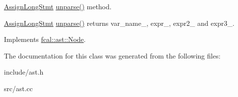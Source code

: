 \hyperlink{classfcal_1_1ast_1_1AssignLongStmt}{Assign\+Long\+Stmt} \hyperlink{classfcal_1_1ast_1_1AssignLongStmt_a7ff252236eef89c19c8c13c224cf8b81}{unparse()} method. 

\hyperlink{classfcal_1_1ast_1_1AssignLongStmt}{Assign\+Long\+Stmt} \hyperlink{classfcal_1_1ast_1_1AssignLongStmt_a7ff252236eef89c19c8c13c224cf8b81}{unparse()} returns var\+\_\+name\+\_\+, expr\+\_\+, expr2\+\_\+ and expr3\+\_\+. 

Implements \hyperlink{classfcal_1_1ast_1_1Node_a81865f5a1df593708a39bf492952742a}{fcal\+::ast\+::\+Node}.



The documentation for this class was generated from the following files\+:\begin{DoxyCompactItemize}
\item 
include/ast.\+h\item 
src/ast.\+cc\end{DoxyCompactItemize}
